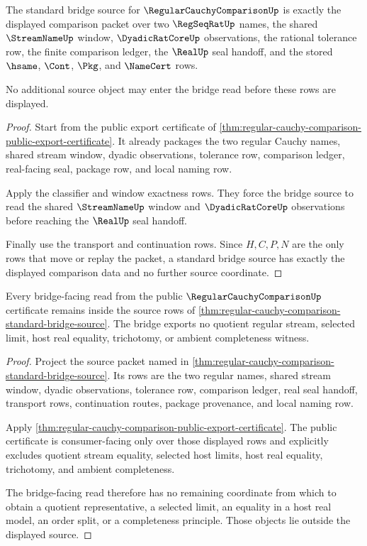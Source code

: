 \begin{theorem}
\label{thm:regular-cauchy-comparison-standard-bridge-source}
The standard bridge source for $\RegularCauchyComparisonUp$ is exactly the displayed comparison packet over two $\RegSeqRatUp$ names, the shared $\StreamNameUp$ window, $\DyadicRatCoreUp$ observations, the rational tolerance row, the finite comparison ledger, the $\RealUp$ seal handoff, and the stored $\hsame$, $\Cont$, $\Pkg$, and $\NameCert$ rows.

No additional source object may enter the bridge read before these rows are displayed.
\end{theorem}
\begin{proof}
Start from the public export certificate of \autoref{thm:regular-cauchy-comparison-public-export-certificate}. It already packages the two regular Cauchy names, shared stream window, dyadic observations, tolerance row, comparison ledger, real-facing seal, package row, and local naming row.

Apply the classifier and window exactness rows. They force the bridge source to read the shared $\StreamNameUp$ window and $\DyadicRatCoreUp$ observations before reaching the $\RealUp$ seal handoff.

Finally use the transport and continuation rows. Since $H,C,P,N$ are the only rows that move or replay the packet, a standard bridge source has exactly the displayed comparison data and no further source coordinate.
\end{proof}

\begin{theorem}
\label{thm:regular-cauchy-comparison-bridge-nonescape}
Every bridge-facing read from the public $\RegularCauchyComparisonUp$ certificate remains inside the source rows of \autoref{thm:regular-cauchy-comparison-standard-bridge-source}. The bridge exports no quotient regular stream, selected limit, host real equality, trichotomy, or ambient completeness witness.
\end{theorem}
\begin{proof}
Project the source packet named in \autoref{thm:regular-cauchy-comparison-standard-bridge-source}. Its rows are the two regular names, shared stream window, dyadic observations, tolerance row, comparison ledger, real seal handoff, transport rows, continuation routes, package provenance, and local naming row.

Apply \autoref{thm:regular-cauchy-comparison-public-export-certificate}. The public certificate is consumer-facing only over those displayed rows and explicitly excludes quotient stream equality, selected host limits, host real equality, trichotomy, and ambient completeness.

The bridge-facing read therefore has no remaining coordinate from which to obtain a quotient representative, a selected limit, an equality in a host real model, an order split, or a completeness principle. Those objects lie outside the displayed source.
\end{proof}

